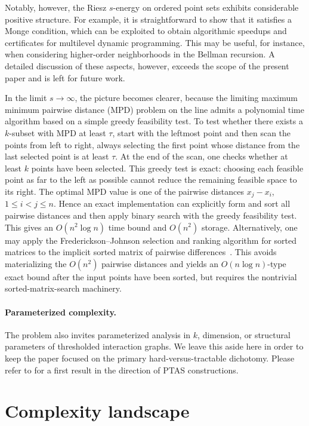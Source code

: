\documentclass[11pt]{article}
\begin{document}
Notably, however, the Riesz $s$-energy on ordered point sets exhibits considerable positive structure.
For example, it is straightforward to show that it satisfies a Monge
condition, which can be exploited to obtain algorithmic speedups and
certificates for multilevel dynamic programming. This may be useful, for
instance, when considering higher-order neighborhoods in the Bellman
recursion. A detailed discussion of these aspects, however, exceeds the
scope of the present paper and is left for future work.


In the limit $s \rightarrow \infty$, the picture becomes clearer, because the limiting maximum minimum pairwise distance (MPD) problem on the line admits a polynomial time 
algorithm based on a simple greedy feasibility test. 
To test whether there exists a \(k\)-subset
with MPD at least \(\tau\), start with the leftmost point and then scan the
points from left to right, always selecting the first point whose distance
from the last selected point is at least \(\tau\). At the end of the scan,
one checks whether at least \(k\) points have been selected. This greedy test
is exact: choosing each feasible point as far to the left as possible cannot
reduce the remaining feasible space to its right.
The optimal MPD value is one of the pairwise distances \(x_j-x_i\),
\(1\le i<j\le n\). Hence an exact implementation can explicitly form and sort
all pairwise distances and then apply binary search with the greedy
feasibility test. This gives an \(O(n^2\log n)\) time bound and \(O(n^2)\)
storage. Alternatively, one may apply the Frederickson--Johnson selection and
ranking algorithm for sorted matrices to the implicit sorted matrix of
pairwise differences~\cite{frederickson1984generalized}. This avoids
materializing the \(O(n^2)\) pairwise distances and yields an
\(O(n\log n)\)-type exact bound after the input points have been sorted, but
requires the nontrivial sorted-matrix-search machinery.


\paragraph{Parameterized complexity.}
The problem also invites parameterized analysis in $k$, dimension, or structural parameters of thresholded interaction graphs. We leave this aside here in order to keep the paper focused on the primary hard-versus-tractable dichotomy. Please refer to \cite{Atta2026} for a first result in the direction of PTAS constructions.  

\section{Complexity landscape}
\end{document}
